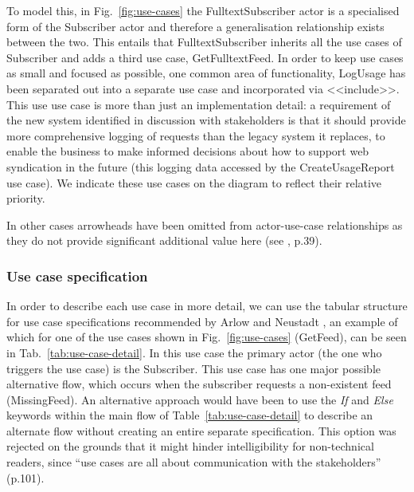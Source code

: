 \documentclass[runningheads,a4paper]{llncs}
\begin{document}
To model this, in Fig.~\ref{fig:use-cases} the \textsf{FulltextSubscriber} actor is a specialised form of the \textsf{Subscriber} actor and therefore a generalisation relationship exists between the two. This entails that \textsf{FulltextSubscriber} inherits all the use cases of \textsf{Subscriber} and adds a third use case, \textsf{GetFulltextFeed}. In order to keep use cases as small and focused as possible, one common area of functionality, \textsf{LogUsage} has been separated out into a separate use case and incorporated via \textsf{<<include>>}. This use use case is more than just an implementation detail: a requirement of the new system identified in discussion with stakeholders is that it should provide more comprehensive logging of requests than the legacy system it replaces, to enable the business to make informed decisions about how to support web syndication in the future (this logging data accessed by the \textsf{CreateUsageReport} use case). We indicate these use cases on the diagram to reflect their relative priority.

In other cases arrowheads have been omitted from actor-use-case relationships as they do not provide significant additional value here (see \cite{ambler}, p.39).

\subsubsection{Use case specification}

In order to describe each use case in more detail, we can use the tabular structure for use case specifications recommended by Arlow and Neustadt \cite{arlow}, an example of which for one of the use cases shown in Fig.~\ref{fig:use-cases} (\textsf{GetFeed}), can be seen in Tab.~\ref{tab:use-case-detail}. In this use case the primary actor (the one who triggers the use case) is the \textsf{Subscriber}. This use case has one major possible alternative flow, which occurs when the subscriber requests a non-existent feed (\textsf{MissingFeed}). An alternative approach would have been to use the \textit{If} and \textit{Else} keywords within the main flow of Table~\ref{tab:use-case-detail} to describe an alternate flow without creating an entire separate specification. This option was rejected on the grounds that it might hinder intelligibility for non-technical readers, since ``use cases are all about communication with the stakeholders'' \cite{arlow} (p.101).
\end{document}

